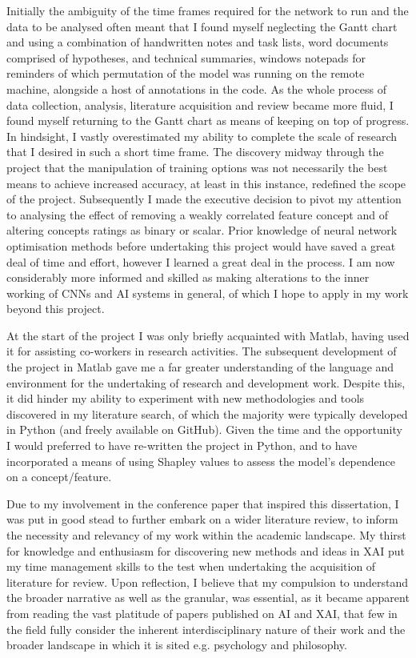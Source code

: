 Initially the ambiguity of the time frames required for the network to run and the data to be analysed often meant that I found myself neglecting the Gantt chart and using a combination of handwritten notes and task lists, word documents comprised of hypotheses, and technical summaries, windows notepads for reminders of which permutation of the model was running on the remote machine, alongside a host of annotations in the code. As the whole process of data collection, analysis, literature acquisition and review became more fluid, I found myself returning to  the Gantt chart as means of keeping on top of progress.
In hindsight, I vastly overestimated my ability to complete the scale of research that I desired in such a short time frame. The discovery midway through the project that the manipulation of training options was not necessarily the best means to achieve increased accuracy, at least in this instance, redefined the scope of the project. Subsequently I made the executive decision to pivot my attention to analysing the effect of removing a weakly correlated feature concept and of altering concepts ratings as binary or scalar. Prior knowledge of neural network optimisation methods before undertaking this project would have saved a great deal of time and effort, however I learned a great deal in the process. I am now considerably more informed and skilled as making alterations to the inner working of CNNs and AI systems in general, of which I hope to apply in my work beyond this project. 

At the start of the project I was only briefly acquainted with Matlab, having used it for assisting co-workers in research activities. The subsequent development of the project in Matlab gave me a far greater understanding of the language and environment for the undertaking of research and development work. Despite this, it did hinder my ability to experiment with new methodologies and tools discovered in my literature search, of which the majority were typically developed in Python (and freely available on GitHub). Given the time and the opportunity I would preferred to have re-written the project in Python, and to have incorporated a means of using Shapley values \cite{yehCompletenessawareConceptBasedExplanations2019} to assess the model’s dependence on a concept/feature.

Due to my involvement in the conference paper \cite{grangeXAISelfexplanatoryAI2022} that inspired this dissertation, I was put in good stead to further embark on a wider literature review, to inform the necessity and relevancy of my work within the academic landscape. My thirst for knowledge and enthusiasm for discovering new methods and ideas in XAI put my time management skills to the test when undertaking the acquisition of literature for review. Upon reflection, I believe that my compulsion to understand the broader narrative as well as the granular, was essential, as it became apparent from reading the vast platitude of papers published on AI and XAI, that few in the field fully consider the inherent interdisciplinary nature of their work and the broader landscape in which it is sited e.g. psychology and philosophy.

